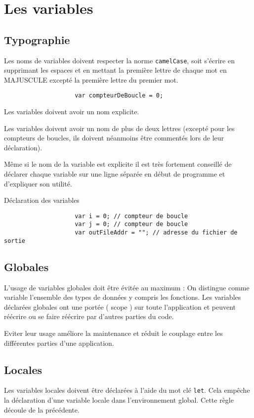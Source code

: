 	\section{Les variables}
		\subsection{Typographie}
			Les noms de variables doivent respecter la norme \verb+camelCase+, soit s'écrire en supprimant les espaces et en mettant la première lettre de chaque mot en MAJUSCULE excepté la première lettre du premier mot.

			\begin{cbox}{}
				\begin{verbatim}
					var compteurDeBoucle = 0;
				\end{verbatim}
			\end{cbox}

			Les variables doivent avoir un nom explicite.

			Les variables doivent avoir un nom de plus de deux lettres (excepté pour les compteurs de boucles, ils doivent néanmoins être commentés lors de leur déclaration).

			Même si le nom de la variable est explicite il est très fortement conseillé de déclarer chaque variable sur une ligne séparée en début de programme et d'expliquer son utilité.

			\begin{cbox}{Déclaration des variables}
				\begin{verbatim}
					var i = 0; // compteur de boucle
					var j = 0; // compteur de boucle
					var outFileAddr = ""; // adresse du fichier de sortie
				\end{verbatim}
			\end{cbox}
			
		\subsection{Globales}
			L'usage de variables globales doit être évitée au maximum : On distingue comme variable l'ensemble des types de données y compris les fonctions. Les variables déclarées globales ont une portée ( scope ) sur toute l'application et peuvent réécrire ou se faire réécrire par d'autres parties du code.

			Eviter leur usage améliore la maintenance et réduit le couplage entre les différentes parties d'une application.

		\subsection{Locales}
			Les variables locales doivent être déclarées à l'aide du mot clé \verb+let+. Cela empêche la déclaration d'une variable locale dans l'environnement global. Cette règle découle de la précédente.

